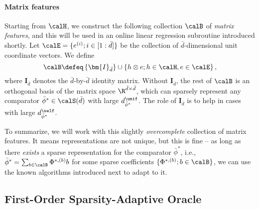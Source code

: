 \documentclass[10pt]{article}
\begin{document}
\paragraph{Matrix features} Starting from $\calH$, we construct the following collection $\calB$ of \emph{matrix features}, and this will be used in an online linear regression subroutine introduced shortly. Let $\calE=\{e^{(i)}; i\in[1:\bar d]\}$ be the collection of $\bar d$-dimensional unit coordinate vectors. We define
\begin{equation*}
\calB\defeq \left\{\bm{I}_{\bar d}\right\}\cup\left\{h\otimes e; h\in\calH, e\in\calE\right\},
\end{equation*}
where $\bm{I}_{\bar d}$ denotes the $\bar d$-by-$\bar d$ identity matrix. Without $\bm{I}_{\bar d}$, the rest of $\calB$ is an orthogonal basis of the matrix space $\R^{\bar d\times\bar d}$, which can sparsely represent any comparator $\bar\phi^*\in \calS(\bar d)$ with large $d^\unif_{\bar\phi^*}$. The role of $\bm{I}_{\bar d}$ is to help in cases with large $d^\self_{\bar\phi^*}$.

To summarize, we will work with this slightly \emph{overcomplete} collection of matrix features. It means representations are not unique, but this is fine -- as long as there \emph{exists} a sparse representation for the comparator $\bar\phi^*$, i.e., $\bar\phi^*=\sum_{b\in\calB}\Phi^{*,(b)}b$ for some sparse coefficients $\{\Phi^{*,(b)};b\in\calB\}$, we can use the known algorithms introduced next to adapt to it. 

\subsection{First-Order Sparsity-Adaptive Oracle}
\end{document}
